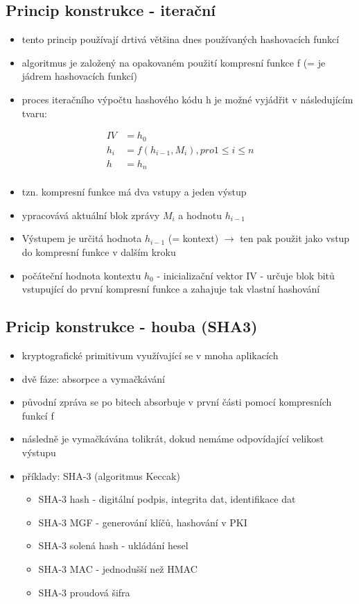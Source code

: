 \subsection{Princip konstrukce - iterační}
\begin{itemize}
    \item tento princip používají drtivá většina dnes používaných hashovacích funkcí
    \item algoritmus je založený na opakovaném použití kompresní funkce f (= je jádrem hashovacích funkcí)
    \item proces iteračního výpočtu hashového kódu h je možné vyjádřit v následujícím tvaru:
\end{itemize}
\begin{align*}
    IV &= h_{0} \\
    h_{i} &= f (h_{i-1}, M_{i}), pro 1 \leq i \leq n \\
    h &= h_{n} \\
\end{align*}
\begin{itemize}
    \item tzn. kompresní funkce má dva vstupy a jeden výstup
    \item ypracovává aktuální blok zprávy $M_{i}$ a hodnotu $h_{i-1}$
    \item Výstupem je určitá hodnota $h_{i-1}$ (= kontext) $\longrightarrow$ ten pak použit jako vstup do kompresní funkce v dalším kroku
    \item počáteční hodnota kontextu $h_{0}$ - inicializační vektor IV - určuje blok bitů vstupující do první kompresní funkce a zahajuje tak vlastní hashování
\end{itemize}

\subsection{Pricip konstrukce - houba (SHA3)}
\begin{itemize}
    \item kryptografické primitivum využívající se v mnoha aplikacích
    \item dvě fáze: absorpce a vymačkávání
    \item původní zpráva se po bitech absorbuje v první části pomocí kompresních funkcí f
    \item následně je vymačkávána tolikrát, dokud nemáme odpovídající velikost výstupu
    \item příklady: SHA-3 (algoritmus Keccak)
    \begin{itemize}
        \item SHA-3 hash - digitální podpis, integrita dat, identifikace dat
        \item SHA-3 MGF - generování klíčů, hashování v PKI
        \item SHA-3 solená hash - ukládání hesel
        \item SHA-3 MAC - jednodušší než HMAC
        \item SHA-3 proudová šifra
    \end{itemize}
\end{itemize}


